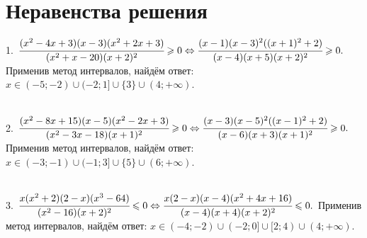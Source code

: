 \documentclass[12pt]{article}
\begin{document}
\section{Неравенства решения}
1. $\cfrac{(x^2-4x+3)(x-3)(x^2+2x+3)}{(x^2+x-20)(x+2)^2}\geqslant0 \Leftrightarrow \cfrac{(x-1)(x-3)^2((x+1)^2+2)}{(x-4)(x+5)(x+2)^2}\geqslant0.$ Применив метод интервалов, найдём ответ: $x\in(-5;-2)\cup(-2;1]\cup\{3\}\cup(4;+\infty).$
\begin{figure}[ht!]
\end{figure}\\
2. $\cfrac{(x^2-8x+15)(x-5)(x^2-2x+3)}{(x^2-3x-18)(x+1)^2}\geqslant0\Leftrightarrow\cfrac{(x-3)(x-5)^2((x-1)^2+2)}{(x-6)(x+3)(x+1)^2}\geqslant0.$ Применив метод интервалов, найдём ответ: $x\in(-3;-1)\cup(-1;3]\cup\{5\}\cup(6;+\infty).$
\begin{figure}[ht!]
\end{figure}\\
3. $\cfrac{x(x^2+2)(2-x)(x^3-64)}{(x^2-16)(x+2)^2}\leqslant 0 \Leftrightarrow \cfrac{x(2-x)(x-4)(x^2+4x+16)}{(x-4)(x+4)(x+2)^2}\leqslant 0.$ Применив метод интервалов, найдём ответ: $x\in(-4;-2)\cup(-2;0]\cup[2;4)\cup(4;+\infty).$
\begin{figure}[ht!]
\end{figure}\\
\end{document}

